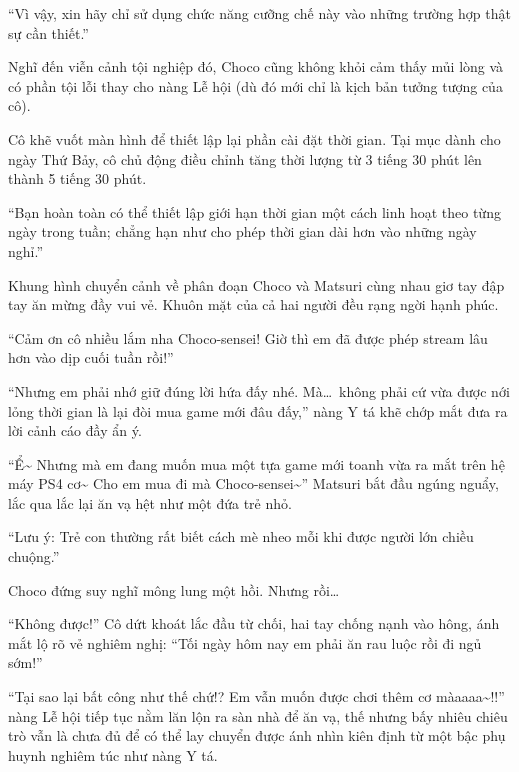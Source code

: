 \documentclass[../main.tex]{subfiles}
\begin{document}
\begin{center}
  ``Vì vậy, xin hãy chỉ sử dụng chức năng cưỡng chế này vào những trường hợp thật sự cần thiết.''
\end{center}

Nghĩ đến viễn cảnh tội nghiệp đó, Choco cũng không khỏi cảm thấy mủi lòng và có phần tội lỗi thay cho nàng Lễ hội (dù đó mới chỉ là kịch bản tưởng tượng của cô).

Cô khẽ vuốt màn hình để thiết lập lại phần cài đặt thời gian. Tại mục dành cho ngày Thứ Bảy, cô chủ động điều chỉnh tăng thời lượng từ 3 tiếng 30 phút lên thành 5 tiếng 30 phút.

\begin{center}
  ``Bạn hoàn toàn có thể thiết lập giới hạn thời gian một cách linh hoạt theo từng ngày trong tuần; chẳng hạn như cho phép thời gian dài hơn vào những ngày nghỉ.''
\end{center}

Khung hình chuyển cảnh về phân đoạn Choco và Matsuri cùng nhau giơ tay đập tay ăn mừng đầy vui vẻ. Khuôn mặt của cả hai người đều rạng ngời hạnh phúc.

``Cảm ơn cô nhiều lắm nha Choco-sensei! Giờ thì em đã được phép stream lâu hơn vào dịp cuối tuần rồi!''

``Nhưng em phải nhớ giữ đúng lời hứa đấy nhé. Mà\dots\ không phải cứ vừa được nới lỏng thời gian là lại đòi mua game mới đâu đấy,'' nàng Y tá khẽ chớp mắt đưa ra lời cảnh cáo đầy ẩn ý.

``Ể\~{} Nhưng mà em đang muốn mua một tựa game mới toanh vừa ra mắt trên hệ máy PS4 cơ\~{} Cho em mua đi mà Choco-sensei\~{}'' Matsuri bắt đầu ngúng nguẩy, lắc qua lắc lại ăn vạ hệt như một đứa trẻ nhỏ.

\begin{center}
  ``Lưu ý: Trẻ con thường rất biết cách mè nheo mỗi khi được người lớn chiều chuộng.''
\end{center}

Choco đứng suy nghĩ mông lung một hồi. Nhưng rồi\dots

``Không được!'' Cô dứt khoát lắc đầu từ chối, hai tay chống nạnh vào hông, ánh mắt lộ rõ vẻ nghiêm nghị: ``Tối ngày hôm nay em phải ăn rau luộc rồi đi ngủ sớm!''

``Tại sao lại bất công như thế chứ!? Em vẫn muốn được chơi thêm cơ màaaaa\~{}!!'' nàng Lễ hội tiếp tục nằm lăn lộn ra sàn nhà để ăn vạ, thế nhưng bấy nhiêu chiêu trò vẫn là chưa đủ để có thể lay chuyển được ánh nhìn kiên định từ một bậc phụ huynh nghiêm túc như nàng Y tá.
\end{document}
